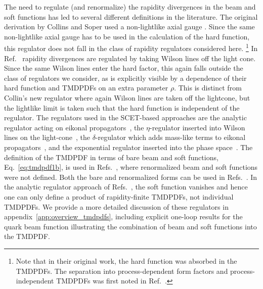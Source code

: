 \documentclass[11pt,a4paper]{article}
\DeclareRobustCommand{\eq}[1]{Eq.~\eqref{eq:#1}}
\DeclareRobustCommand{\app}[1]{appendix~\ref{app:#1}}
\DeclareRobustCommand{\mycite}[1]{Ref.~\cite{#1}}
\DeclareRobustCommand{\mycites}[1]{Refs.~\cite{#1}}
\begin{document}
The need to regulate (and renormalize) the rapidity divergences in the beam and soft functions has led to several different definitions in the literature.
The original derivation by Collins and Soper used a non-lightlike axial gauge \cite{Soper:1979fq,Collins:1981uk}.
Since the same non-lightlike axial gauge has to be used in the calculation of the hard function,
this regulator does not fall in the class of rapidity regulators considered here.%
\footnote{Note that in their original work, the hard function was absorbed in the TMDPDFs.
The separation into process-dependent form factors and process-independent TMDPDFs was first noted in \mycite{Catani:2000vq}.}
In \mycite{Ji:2004wu} rapidity divergences are regulated by taking Wilson lines off the light cone.
Since the same Wilson lines enter the hard factor, this again falls outside the class of regulators we consider, as is explicitly visible by a dependence of their hard function and TMDPDFs on an extra parameter $\rho$.
This is distinct from Collin's new regulator \cite{Collins:1350496} where again Wilson lines are taken off the lightcone, but the lightlike limit is taken such that the hard function is independent of the regulator.
The regulators used in the SCET-based approaches are the analytic regulator acting on eikonal propagators~\cite{Beneke:2003pa, Chiu:2007yn, Becher:2011dz}, the $\eta$-regulator inserted into Wilson lines on the light-cone~\cite{Chiu:2011qc, Chiu:2012ir}, the $\delta$-regulator which adds  mass-like terms to eikonal propagators~\cite{Chiu:2009yx, GarciaEchevarria:2011rb}, and the exponential regulator inserted into the phase space~\cite{Li:2016axz}.
%
The definition of the TMDPDF in terms of bare beam and soft functions, \eq{tmdpdf1b}, is used in \mycites{Collins:1350496,Ji:2004wu,GarciaEchevarria:2011rb,Echevarria:2012js}, where renormalized beam and soft functions were not defined.
Both the bare and renormalized forms can be used in \mycites{Chiu:2012ir,Li:2016axz}.
In the analytic regulator approach of \mycites{Becher:2010tm,Becher:2012yn}, the soft function vanishes and hence one can only define a product of rapidity-finite TMDPDFs, not individual TMDPDFs.
We provide a more detailed discussion of these regulators in \app{overview_tmdpdfs}, including explicit one-loop results for the quark beam function illustrating the combination of beam and soft functions into the TMDPDF.
\end{document}
